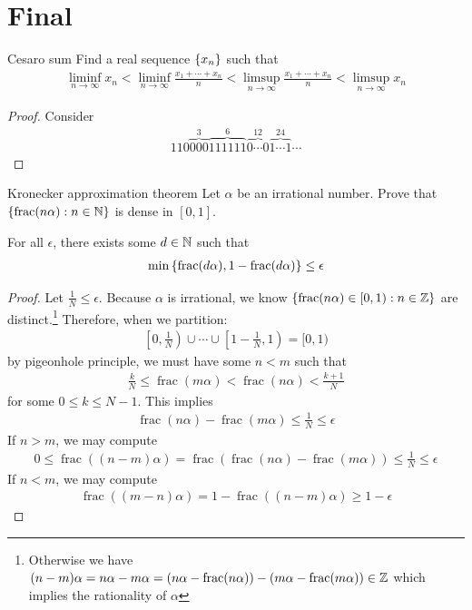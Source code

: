 \documentclass{report}
\begin{document}
\section{Final}
\begin{question}{Cesaro sum}{}
Find a real sequence $\left\{ x_n \right\}$ such that 
\begin{align*}
\liminf_{n\to\infty} x_n < \liminf_{n\to\infty} \frac{x_1 + \cdots + x_n}{n} < \limsup_{n\to\infty} \frac{x_1 + \cdots +x_n}{n} < \limsup_{n\to\infty} x_n 
\end{align*}
\end{question}
\begin{proof}
Consider 
\begin{align*}
110\overbrace{000}^{3}\overbrace{111111}^{6} \overbrace{0\cdots 0}^{12} \overbrace{1 \cdots 1}^{24} \cdots  
\end{align*}
\end{proof}
\begin{question}{Kronecker approximation theorem}{}
  Let $\alpha $ be an irrational number. Prove that $\left\{ \operatorname{frac}(n\alpha ): n\in\mathbb{N}  \right\}$ is dense in $[0,1]$. 
\end{question}
\begin{lemma}
For all $\epsilon $, there exists some  $d \in\mathbb{N}$ such that 
\begin{align*}
  \min  \left\{ \operatorname{frac}(d\alpha ), 1- \operatorname{frac}(d\alpha ) \right\}\leq \epsilon  
\end{align*}
\end{lemma}
\begin{proof}
Let $\frac{1}{N}\leq \epsilon $. Because $\alpha $ is irrational, we know $\left\{ \operatorname{frac}(n\alpha )\in [0,1): n\in\mathbb{Z} \right\}$ are distinct.\footnote{Otherwise we have $(n-m) \alpha  =  n \alpha  - m\alpha = \left(n\alpha - \operatorname{frac}(n\alpha ) \right) - \left(m \alpha  - \operatorname{frac}(m\alpha ) \right)\in\mathbb{Z}$
which implies the rationality of $\alpha$} Therefore, when we partition: 
\begin{align*}
\left[0,\frac{1}{N}\right) \cup  \cdots \cup  \left[1- \frac{1}{N}, 1\right)= [0,1)
\end{align*}
by pigeonhole principle, we must have some $n<m$ such that   
\begin{align*}
\frac{k}{N}\leq \operatorname{frac}(m\alpha )  < \operatorname{frac}(n\alpha ) < \frac{k+1}{N}
\end{align*}
for some $0\leq k \leq N-1$. This implies 
\begin{align*}
\operatorname{frac}(n \alpha )-\operatorname{frac}(m\alpha ) \leq \frac{1}{N} \leq \epsilon 
\end{align*}
If $n> m$, we may compute 
\begin{align*}
0 \leq \operatorname{frac}((n-m)\alpha )= \operatorname{frac}(\operatorname{frac}(n\alpha )-\operatorname{frac}(m\alpha )) \leq \frac{1}{N} \leq  \epsilon 
\end{align*}
If $n<m$, we may compute 
 \begin{align*}
\operatorname{frac}((m-n)\alpha )= 1-\operatorname{frac}((n-m)\alpha ) \geq 1-\epsilon  
\end{align*}
\end{proof}
\end{document}
